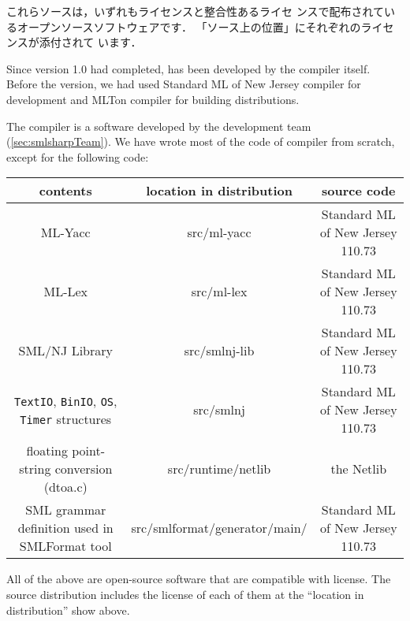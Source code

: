 	これらソースは，いずれも\smlsharp{}ライセンスと整合性あるライセ
ンスで配布されているオープンソースソフトウェアです．
	「\smlsharp{}ソース上の位置」にそれぞれのライセンスが添付されて
います．
\else%

	Since version 1.0 had completed, \smlsharp{} has been
developed by the \smlsharp{} compiler itself.
	Before the \version{} version, we had used Standard ML of New
Jersey compiler for development and MLTon compiler for building
distributions.

	The \smlsharp{} compiler is a software developed by the
\smlsharp{} development team (\ref{sec:smlsharpTeam}).
	We have wrote most of the code of \smlsharp{} compiler from
scratch, except for the following code: 

\begin{center}
\begin{tabular}{|c|c|c|}
\hline
contents & location in \smlsharp{} distribution & source code
\\\hline
ML-Yacc & src/ml-yacc  & Standard ML of New Jersey 110.73
\\\hline
ML-Lex & src/ml-lex  & Standard ML of New Jersey 110.73
\\\hline
SML/NJ Library & src/smlnj-lib &  Standard ML of New Jersey 110.73
\\\hline
{\tt TextIO},
{\tt BinIO},
{\tt OS},
{\tt Timer}
structures
&
src/smlnj
&
Standard ML of New Jersey 110.73
\\\hline
floating point-string conversion
(dtoa.c)
&
src/runtime/netlib
&
the Netlib
\\\hline
SML grammar definition used 
in SMLFormat tool
&
src/smlformat/generator/main/
&
Standard ML of New Jersey 110.73
\\\hline
\end{tabular}
\end{center}

	All of the above are open-source software that are compatible
with \smlsharp{} license.
	The \smlsharp{} source distribution includes the license of each
of them at the ``location in \smlsharp{} distribution'' show above.
\fi%

\subsection{}

